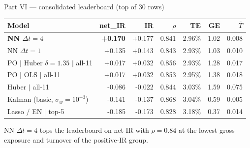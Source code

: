\documentclass[10pt, aspectratio=169]{beamer}
\begin{document}
\begin{frame}{Part VI --- consolidated leaderboard (top of 30 rows)}
	\centering\small
	\begin{tabular}{l r r r r r r}
		\toprule
		\textbf{Model}                              & \textbf{net\_IR} & \textbf{IR} & \textbf{$\rho$} & \textbf{TE} & \textbf{GE} & \textbf{$\bar T$} \\
		\midrule
		\textbf{NN $\Delta t = 4$}                  & \textbf{+0.170}  & +0.177      & 0.841           & 2.96\%      & 1.02        & 0.008             \\
		NN $\Delta t = 1$                           & +0.135           & +0.143      & 0.843           & 2.93\%      & 1.03        & 0.010             \\
		PO $\mid$ Huber $\delta=1.35$ $\mid$ all-11 & +0.017           & +0.032      & 0.856           & 2.93\%      & 1.28        & 0.017             \\
		PO $\mid$ OLS $\mid$ all-11                 & +0.017           & +0.032      & 0.853           & 2.95\%      & 1.38        & 0.018             \\
		Huber $\mid$ all-11                  & -0.086           & -0.022      & 0.844           & 3.03\%      & 1.59        & 0.075             \\
		Kalman (basic, $\sigma_w=10^{-3}$)          & -0.141           & -0.137      & 0.868           & 3.04\%      & 0.59        & 0.005             \\
		Lasso / EN $\mid$ top-5              & -0.185           & -0.173      & 0.828           & 3.18\%      & 0.37        & 0.014             \\
		\bottomrule
	\end{tabular}

	\medskip
	\alert{NN $\Delta t = 4$ tops the leaderboard on net IR} with $\rho = 0.84$ at the lowest gross exposure and turnover of the positive-IR group.
\end{frame}
\end{document}

